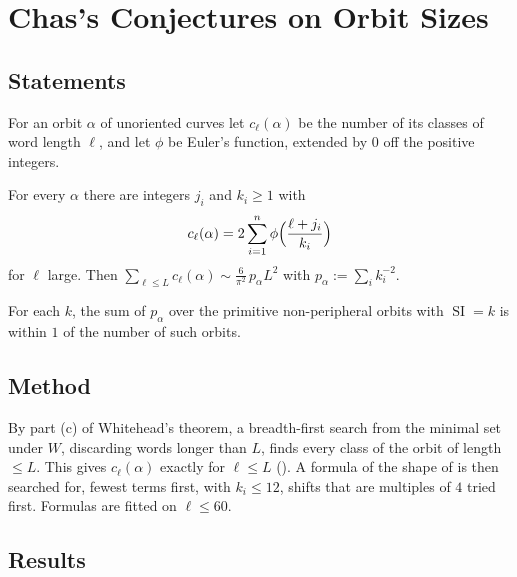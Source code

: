 \documentclass[10pt]{article}
\begin{document}

\section{Chas's Conjectures on Orbit Sizes}

\subsection{Statements}

For an orbit $\alpha$ of unoriented curves let $c_\ell(\alpha)$ be the number of its classes of word length $\ell$, and let $\phi$ be Euler's function, extended by $0$ off the positive integers.

\begin{conj}\label{conj:four}
	For every $\alpha$ there are integers $j_i$ and $k_i \geq 1$ with
	\[
		c_\ell(\alpha) = 2 \sum_{i=1}^n \phi\Bigl(\frac{\ell + j_i}{k_i}\Bigr)
	\]
	for $\ell$ large.
	Then $\sum_{\ell \leq L} c_\ell(\alpha) \sim \frac{6}{\pi^2}\, p_\alpha L^2$ with $p_\alpha := \sum_i k_i^{-2}$.
\end{conj}

\begin{conj}\label{conj:five}
	For each $k$, the sum of $p_\alpha$ over the primitive non-peripheral orbits with $\operatorname{SI} = k$ is within $1$ of the number of such orbits.
\end{conj}

\subsection{Method}

By part (c) of Whitehead's theorem, a breadth-first search from the minimal set under $W$, discarding words longer than $L$, finds every class of the orbit of length $\leq L$.
This gives $c_\ell(\alpha)$ exactly for $\ell \leq L$ ().
A formula of the shape of  is then searched for, fewest terms first, with $k_i \leq 12$, shifts that are multiples of $4$ tried first.
Formulas are fitted on $\ell \leq 60$.

\subsection{Results}
\end{document}
